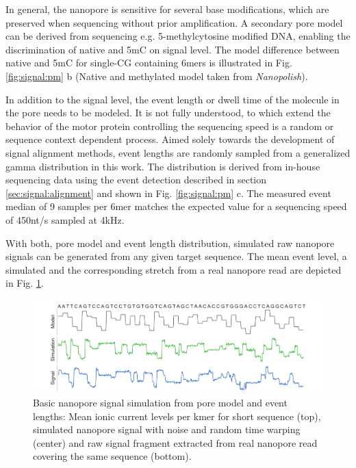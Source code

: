 In general, the nanopore is sensitive for several base modifications, which are preserved when sequencing without prior amplification. A secondary pore model can be derived from sequencing e.g. 5-methylcytosine modified DNA, enabling the discrimination of native and 5mC on signal level. The model difference between native and 5mC for single-CG containing 6mers is illustrated in Fig. \ref{fig:signal:pm} b (Native and methylated model taken from \textit{Nanopolish}).

In addition to the signal level, the event length or dwell time of the molecule in the pore needs to be modeled. It is not fully understood, to which extend the behavior of the motor protein controlling the sequencing speed is a random or sequence context dependent process. Aimed solely towards the development of signal alignment methods, event lengths are randomly sampled from a generalized gamma distribution in this work. 
The distribution is derived from in-house sequencing data using the event detection described in section \ref{sec:signal:alignment} and shown in Fig. \ref{fig:signal:pm} c. The measured event median of 9 samples per 6mer matches the expected value for a sequencing speed of 450nt/s sampled at 4kHz.

With both, pore model and event length distribution, simulated raw nanopore signals can be generated from any given target sequence. The mean event level, a simulated and the corresponding stretch from a real nanopore read are depicted in Fig. \ref{fig:signal:simulation}.

\begin{figure}[h]
	\centering
	\includegraphics[width=1.0\textwidth]{figures/signal/simulation.pdf}
	\captionsetup{format=plain}
	\caption[Basic signal simulation]{Basic nanopore signal simulation from pore model and event lengths: Mean ionic current levels per kmer for short sequence (top), simulated nanopore signal with noise and random time warping (center) and raw signal fragment extracted from real nanopore read covering the same sequence (bottom).}
	\label{fig:signal:simulation}
\end{figure}

